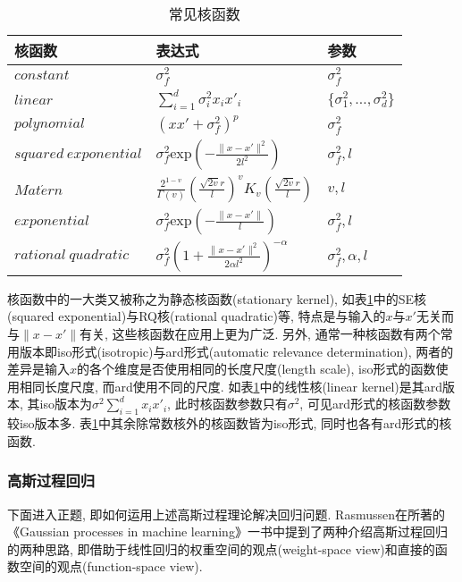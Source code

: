                 \begin{table}[h]
                    \centering
                    \caption{常见核函数}
                    \label{核函数}
                    \begin{tabular}{lll}
                    \hline
                    \multicolumn{1}{l}{核函数}   & \multicolumn{1}{l}{表达式} & \multicolumn{1}{l}{参数} \\ \hline
                    $constant$                    &    $\sigma^{2}_{f}$      &   $\sigma^{2}_{f}$  \\
                    $linear$                      &  $\sum^{d}_{i=1}\sigma^{2}_{i}x_{i}x'_{i}$ & $\{\sigma^{2}_{1},\dots,\sigma^{2}_{d}\}$        \\
                    $polynomial$                  &  $(xx'+\sigma^{2}_{f})^{p}$ &     $\sigma^{2}_{f}$    \\
                    $squared\ exponential$     & $\sigma^{2}_{f}\mathrm{exp}\left(-\frac{\|x-x'\|^{2}}{2l^{2}}\right)$ & $\sigma^{2}_{f},l$   \\
                    $Mat\acute{e}rn$ &    $\frac{2^{1-v}}{\Gamma(v)} \left(\frac{\sqrt{2v}r}{l}\right)^{v}K_{v}\left(\frac{\sqrt{2v}r}{l}\right)$ &  $v,l$  \\
                    $exponential$  &   $\sigma^{2}_{f}\mathrm{exp}\left(-\frac{\|x-x'\|}{l}\right)$  &  $\sigma^{2}_{f},l$   \\
                    $rational\ quadratic$ &   $\sigma^{2}_{f}\left(1+\frac{\|x-x'\|^{2}}{2\alpha l^{2}}\right)^{-\alpha}$  &  $\sigma^{2}_{f},\alpha,l$   \\ \hline
                    \end{tabular}
                \end{table}

                核函数中的一大类又被称之为静态核函数(stationary kernel), 如表\ref{核函数}中的SE核(squared exponential)与RQ核(rational quadratic)等, 特点是与输入的$x$与$x'$无关而与$\|x-x'\|$有关, 这些核函数在应用上更为广泛. 另外, 通常一种核函数有两个常用版本即iso形式(isotropic)与ard形式(automatic relevance determination), 两者的差异是输入$x$的各个维度是否使用相同的长度尺度(length scale), iso形式的函数使用相同长度尺度, 而ard使用不同的尺度. 如表\ref{核函数}中的线性核(linear kernel)是其ard版本, 其iso版本为$\sigma^{2}\sum^{d}_{i=1}x_{i}x'_{i}$, 此时核函数参数只有$\sigma^{2}$, 可见ard形式的核函数参数较iso版本多. 表\ref{核函数}中其余除常数核外的核函数皆为iso形式, 同时也各有ard形式的核函数.

        \subsubsection{高斯过程回归}
            下面进入正题, 即如何运用上述高斯过程理论解决回归问题. Rasmussen在所著的《Gaussian processes in machine learning》一书中提到了两种介绍高斯过程回归的两种思路, 即借助于线性回归的权重空间的观点(weight-space view)和直接的函数空间的观点(function-space view).

